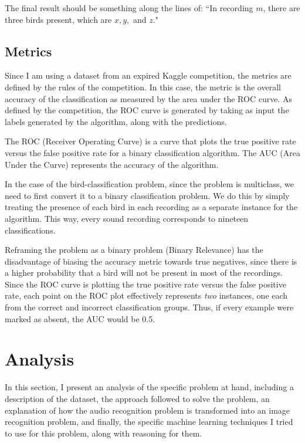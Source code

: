 \documentclass[11pt]{article}
\begin{document}
The final result should be something along the lines of: ``In recording $m$, there are three birds present, which are $x,y,$ and $z$."

\subsection{Metrics}

Since I am using a dataset from an expired Kaggle competition, the metrics are defined by the rules of the competition. In this case, the metric is the overall accuracy of the classification as measured by the area under the ROC curve. As defined by the competition, the ROC curve is generated by taking as input the labels generated by the algorithm, along with the predictions.

The ROC (Receiver Operating Curve) is a curve that plots the true positive rate versus the false positive rate for a binary classification algorithm. The AUC (Area Under the Curve) represents the accuracy of the algorithm.

In the case of the bird-classification problem, since the problem is multiclass, we need to first convert it to a binary classification problem. We do this by simply treating the presence of each bird in each recording as a separate instance for the algorithm. This way, every sound recording corresponds to nineteen classifications.

Reframing the problem as a binary problem (Binary Relevance) has the disadvantage of biasing the accuracy metric towards true negatives, since there is a higher probability that a bird will not be present in most of the recordings. Since the ROC curve is plotting the true positive rate versus the false positive rate, each point on the ROC plot effectively represents \textit{two} instances, one each from the correct and incorrect classification groups. Thus, if every example were marked as absent, the AUC would be 0.5. 

\section{Analysis}

In this section, I present an analysis of the specific problem at hand, including a description of the dataset, the approach followed to solve the problem, an explanation of how the audio recognition problem is transformed into an image recognition problem, and finally, the specific machine learning techniques I tried to use for this problem, along with reasoning for them.
\end{document}
